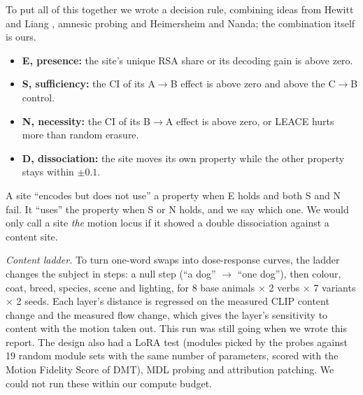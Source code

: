 \documentclass[twoside,english]{article}
\begin{document}
To put all of this together we wrote a decision rule, combining ideas from Hewitt and Liang
\citep{hewitt2019control}, amnesic probing and Heimersheim and Nanda; the combination itself is ours.
\begin{itemize}
\item \textbf{E, presence:} the site's unique RSA share or its decoding gain is above zero.
\item \textbf{S, sufficiency:} the CI of its A$\to$B effect is above zero and above the C$\to$B control.
\item \textbf{N, necessity:} the CI of its B$\to$A effect is above zero, or LEACE hurts more than
  random erasure.
\item \textbf{D, dissociation:} the site moves its own property while the other property stays
  within $\pm 0.1$.
\end{itemize}
A site ``encodes but does not use'' a property when E holds and both S and N fail. It ``uses'' the
property when S or N holds, and we say which one. We would only call a site \emph{the} motion locus if
it showed a double dissociation against a content site.

\emph{Content ladder.} To turn one-word swaps into dose-response curves, the ladder changes the
subject in steps: a null step (``a dog'' $\to$ ``one dog''), then colour, coat, breed, species, scene
and lighting, for 8 base animals $\times$ 2 verbs $\times$ 7 variants $\times$ 2 seeds. Each layer's
distance is regressed on the measured CLIP content change and the measured flow change, which gives
the layer's sensitivity to content with the motion taken out. This run was still going when we wrote
this report. The design also had a LoRA test (modules picked by the probes against 19 random module
sets with the same number of parameters, scored with the Motion Fidelity Score of DMT), MDL probing
\citep{voita2020mdl} and attribution patching. We could not run these within our compute budget.
\end{document}
